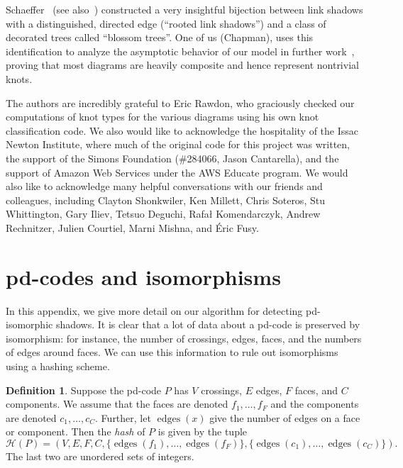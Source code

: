\documentclass[amsmath,secnumarabic,amssymb,floatfix,nofootinbib,nobibnotes,letterpaper,11pt,tightenlines,showkeys]{revtex4}
\theoremstyle{definition}
\newtheorem{definition}[theorem]{Definition}
\newcommand{\pdcode}{pd-code }
\newcommand{\edges}{\operatorname{edges}}
\let\mgp=\marginpar \marginparwidth18mm \marginparsep1mm
\def\marginpar#1{\mgp{\raggedright\tiny #1}}
\let\lbl=\label
\def\label#1{\lbl{#1}\ifinner\else\marginpar{\ref{#1} #1}\ignorespaces\fi}
\begin{document}
Schaeffer~\cite{Schaeffer:1997wo} (see also~\cite{Bouttier:2002iu}) constructed a very insightful bijection between link shadows with a distinguished, directed edge (``rooted link shadows'') and a class of decorated trees called ``blossom trees''. One of us (Chapman), uses this identification to analyze the asymptotic behavior of our model in further work~\cite{Chapman2015knotasymp}, proving that most diagrams are heavily composite and hence represent nontrivial knots.

\acknowledgments
The authors are incredibly grateful to Eric Rawdon, who graciously checked our computations of knot types for the various diagrams using his own knot classification code. We also would like to acknowledge the hospitality of the Issac Newton Institute, where much of the original code for this project was written, the support of the Simons Foundation (\#284066, Jason Cantarella), and the support of Amazon Web Services under the AWS Educate program. We would also like to acknowledge many helpful conversations with our friends and colleagues, including Clayton Shonkwiler, Ken Millett, Chris Soteros, Stu Whittington, Gary Iliev, Tetsuo Deguchi, Rafa\l{} Komendarczyk, Andrew Rechnitzer, Julien Courtiel, Marni Mishna, and \'Eric Fusy.

\appendix
\section{pd-codes and isomorphisms}
\label{app:pdcodes}

In this appendix, we give more detail on our algorithm for detecting pd-isomorphic shadows. It is clear that a lot of data about a \pdcode is preserved by isomorphism: for instance, the number of crossings, edges, faces, and the numbers of edges around faces. We can use this information to rule out isomorphisms using a hashing scheme.

\begin{definition}
Suppose the \pdcode $P$ has $V$ crossings, $E$ edges, $F$ faces, and $C$ components. We assume that the faces are denoted $f_1, \dots, f_F$ and the components are denoted $c_1, \dots, c_C$. Further, let $\edges(x)$ give the number of edges on a face or component. Then the \emph{hash} of $P$ is given by the tuple
\begin{equation*}
\mathcal{H}(P) = (V,E,F,C,\{ \edges(f_1), \dots, \edges(f_F) \},
 \{ \edges(c_1), \dots, \edges(c_C) \}).
\end{equation*}
The last two are unordered sets of integers.
\end{definition}
\end{document}
